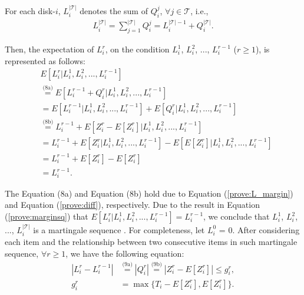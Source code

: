 \documentclass[conference]{IEEEtran}
\begin{document}
\vspace{-0.2cm}
For each disk-$i$, $L_i^{\mathcal{|T|}}$ denotes the sum of $Q_i^j$, $\forall j \in \mathcal{T}$, i.e., 
 \vspace{-0.1cm}
\begin{align}
L_i^{\mathcal{|T|}} = \sum\nolimits_{j = 1}^{\mathcal{|T|}} Q_i^j
=  L_i^{\mathcal{|T|} - 1} + Q_i^{\mathcal{|T|}}. \label{prove:L_margin}
\end{align}

Then, the expectation of $L_i^{r}$, on the condition $L_i^{1}$, $L_i^{2}$, ..., $L_i^{r-1}$ ($r \geq 1$), is represented as follows:
\vspace{-0.1cm}
\begin{align}
&E[L_i^{r}|L_i^{1}, L_i^{2}, ..., L_i^{r-1}] \nonumber\\
&\overset{\text{(8a)}}{=}E[L_i^{r-1} + Q_i^{r} |L_i^{1}, L_i^{2}, ..., L_i^{r-1}] \nonumber\\
&\overset{\text{}}{=}E[L_i^{r-1} |L_i^{1}, L_i^{2}, ..., L_i^{r-1}]
+ E[Q_i^{r} |L_i^{1}, L_i^{2}, ..., L_i^{r-1}] \nonumber\\
&\overset{\text{(8b)}}{=}L_i^{r-1} + E[Z_i^r - E[Z_i^r] |L_i^{1}, L_i^{2}, ..., L_i^{r-1}]\nonumber\\
&=L_i^{r-1} + E[Z_i^r|L_i^{1}, L_i^{2}, ..., L_i^{r-1}]
-E[E[Z_i^r] |L_i^{1}, L_i^{2}, ..., L_i^{r-1}]\nonumber\\
&=L_i^{r-1} + E[Z_i^r] - E[Z_i^r]\nonumber\\
&=L_i^{r-1}.\label{prove:marginsq}
\end{align}

\vspace{-0.2cm}
The Equation (8a) and Equation (8b) hold due to Equation (\ref{prove:L_margin}) and Equation (\ref{prove:diff}), respectively. Due to the result in Equation (\ref{prove:marginsq}) that $E[L_i^{r}|L_i^{1}, L_i^{2}, ..., L_i^{r-1}] = L_i^{r-1}$, we conclude that $L_i^{1}$, $L_i^{2}$, ..., $L_i^{|\mathcal{T}|}$ is a martingale sequence \cite{b13}. For completeness, let $L_i^{0}$ = 0. After considering each item and the relationship between two consecutive items in such martingale sequence, $\forall r \geq 1$, we have the following equation:
\vspace{-0.2cm}
\begin{align}
  |L_i^r - L_i^{r-1}|&\overset{\text{(9a)}}{=} |Q_i^{r}| \overset{\text{(9b)}}{=} |Z_i^r - E[Z_i^r]|\leq g_i^r, \label{prove:bound1}\\
  g_i^r &= \max\{T_i -  E[Z_i^r], E[Z_i^r]\}.\label{prove:bound}
\end{align}
\end{document}
